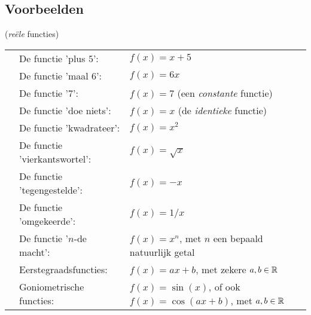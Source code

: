 \documentclass{ximera}
\begin{document}
\subsection{Voorbeelden}

\begin{example} (\textit{reële} functies) %
\\
\begin{tabular}[t]{l l l}
    & De functie 'plus $5$':       & $f(x) = x + 5$ \\
    & De functie 'maal 6':         & $f(x) = 6x$ \\
    & De functie '7':              & $f(x) = 7$  (een \textit{constante} functie) \\
    & De functie 'doe niets':      & $f(x) = x$  (de \textit{identieke} functie) \\
    & De functie 'kwadrateer':     & $f(x) = x^2$ \\
    & De functie 'vierkantswortel':& $f(x) = \sqrt{x}$ \\   
    & De functie 'tegengestelde':  & $f(x) = -x$ \\
    & De functie 'omgekeerde':     & $f(x) = 1/x$ \\
    & De functie '$n$-de macht':   & $f(x) = x^n$, met $n$ een bepaald %
     natuurlijk getal \\
    & Eerstegraadsfuncties:        & $f(x) = ax + b$, met zekere $a,b \in \mathbb{R}$  \\
    & Goniometrische functies:     & $f(x) = \sin(x)$, of ook $f(x)=\cos(ax+b)$, met $a,b \in \mathbb{R}$     \\
\end{tabular}

\end{example}
\end{document}
